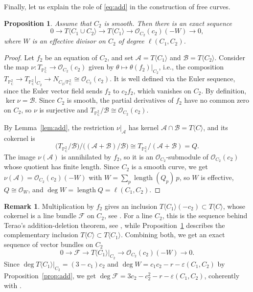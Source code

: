 \documentclass[11pt]{amsart}
\newtheorem{proposition}[theorem]{Proposition}
\theoremstyle{definition}
\newtheorem{remark}[theorem]{Remark}
\numberwithin{equation}{section}
\newcommand{\PP}{\mathbb{P}}
\newcommand{\CC}{\mathbb{C}}
\newcommand{\cO}{\mathcal{O}}
\newcommand{\gadd}[1]{#1}
\DeclareMathOperator{\length}{length}
\begin{document}
Finally, let us explain the role of \eqref{eq:add} in the construction of free curves.

\begin{proposition}\label{prop:del}
Assume that $C_2$ is smooth. Then there is an exact sequence
\[
0\to T\langle C_1\cup C_2\rangle\to T\langle C_1\rangle\to\cO_{C_2}(c_2)(-W)\to0,
\]
where $W$ is an effective divisor on $C_2$ of degree $\ell(C_1,C_2)$.
\end{proposition}

\begin{proof}
Let $f_2$ be an equation of $C_2$, and set $\mathcal{A}=T\langle C_1\rangle$ and
$\mathcal{B}=T\langle C_2\rangle$.
Consider the map $\nu\colon T_{\PP^2_\CC}\to\cO_{C_2}(c_2)$ given by
$\theta\mapsto\theta(f_2)|_{C_2}$, i.e., the composition
$T_{\PP^2_\CC}\to T_{\PP^2_\CC}|_{C_2}\to N_{C_2/\PP^2_\CC}\cong\cO_{C_2}(c_2)$.
It is well defined via the Euler sequence, since the Euler vector field sends $f_2$ to
$c_2f_2$, which vanishes on $C_2$.
By definition, $\ker\nu=\mathcal{B}$.
Since $C_2$ is smooth, the partial derivatives of $f_2$ have no common zero on $C_2$,
so $\nu$ is surjective and $T_{\PP^2_\CC}/\mathcal{B}\cong\cO_{C_2}(c_2)$.

By Lemma~\ref{lem:add}, the restriction $\nu|_{\mathcal{A}}$ has kernel
$\mathcal{A}\cap\mathcal{B}=T\langle C\rangle$, and its cokernel is
\[
\bigl(T_{\PP^2_\CC}/\mathcal{B}\bigr)\big/\bigl((\mathcal{A}+\mathcal{B})/\mathcal{B}\bigr)
\cong T_{\PP^2_\CC}/(\mathcal{A}+\mathcal{B})=Q .
\]
The image $\nu(\mathcal{A})$ is annihilated by $f_2$, so it is an
$\cO_{C_2}$-submodule of $\cO_{C_2}(c_2)$ whose quotient has finite length.
Since $C_2$ is a smooth curve, we get $\nu(\mathcal{A})=\cO_{C_2}(c_2)(-W)$ with
$W=\sum_p\length(Q_p)\,p$, so $W$ is effective, $Q\cong\cO_W$, and
$\deg W=\length Q=\ell(C_1,C_2)$.
\end{proof}

\begin{remark}\label{rem:dimca}
Multiplication by $f_2$ gives an inclusion $T\langle C_1\rangle(-c_2)\subset T\langle C\rangle$,
whose cokernel is a line bundle $\mathcal{F}$ on $C_2$, see \cite[Theorem~1.1]{D24}.
For a line $C_2$, this is the sequence behind Terao's addition-deletion theorem,
see \cite{Di17}, while Proposition~\ref{prop:del} describes the complementary inclusion
$T\langle C\rangle\subset T\langle C_1\rangle$.
Combining both, we get an exact sequence of vector bundles on $C_2$
\[
0\to\mathcal{F}\to T\langle C_1\rangle|_{C_2}\to\cO_{C_2}(c_2)(-W)\to0 .
\]
Since $\deg T\langle C_1\rangle|_{C_2}=\gadd{(3-c_1)c_2}$ and $\deg W=c_1c_2-r-\varepsilon(C_1,C_2)$
by Proposition~\ref{prop:add}, we get
$\deg\mathcal{F}=3c_2-c_2^2-r-\varepsilon(C_1,C_2)$,
coherently with \cite[Theorem~1.1]{D24}.
\end{remark}
\end{document}
